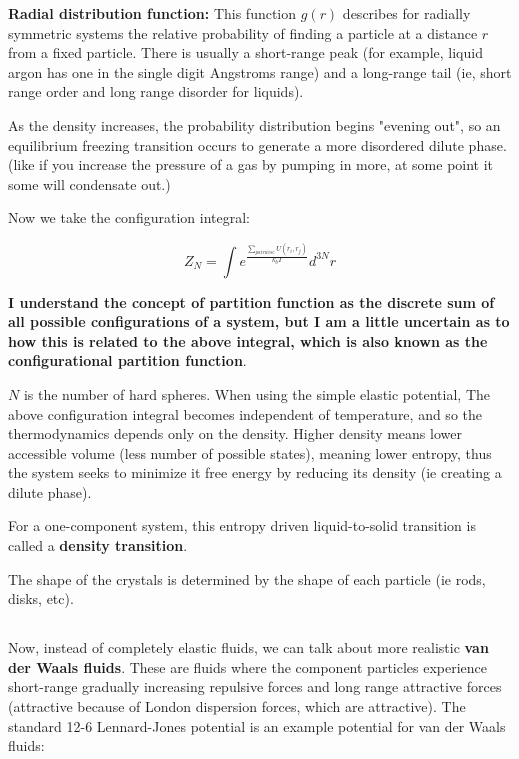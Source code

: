 \documentclass{article}
\begin{document}
\textbf{Radial distribution function: } This function $g(r)$ describes for radially symmetric systems the relative probability of finding a particle at a distance $r$ from a fixed particle. There is usually a short-range peak (for example, liquid argon has one in the single digit Angstroms range) and a long-range tail (ie, short range order and long range disorder for liquids).

As the density increases, the probability distribution begins "evening out", so an equilibrium freezing transition occurs to generate a more disordered dilute phase. (like if you increase the pressure of a gas by pumping in more, at some point it some will condensate out.)

Now we take the configuration integral:

\[Z_N=\int e^{\frac{\sum_{pairwise} U(r_i,r_j)}{k_bT}}d^{3N}r\]

\textbf{I understand the concept of partition function as the discrete sum of all possible configurations of a system, but I am a little uncertain as to how this is related to the above integral, which is also known as the configurational partition function}.

$N$ is the number of hard spheres. When using the simple elastic potential, The above configuration integral becomes independent of temperature, and so the thermodynamics depends only on the density. Higher density means lower accessible volume (less number of possible states), meaning lower entropy, thus the system seeks to minimize it free energy by reducing its density (ie creating a dilute phase).

For a one-component system, this entropy driven liquid-to-solid transition is called a \textbf{density transition}.

The shape of the crystals is determined by the shape of each particle (ie rods, disks, etc).

\subsection{}

Now, instead of completely elastic fluids, we can talk about more realistic \textbf{van der Waals fluids}. These are fluids where the component particles experience short-range gradually increasing repulsive forces and long range attractive forces (attractive because of London dispersion forces, which are attractive). The standard 12-6 Lennard-Jones potential is an example potential for van der Waals fluids:
\end{document}
